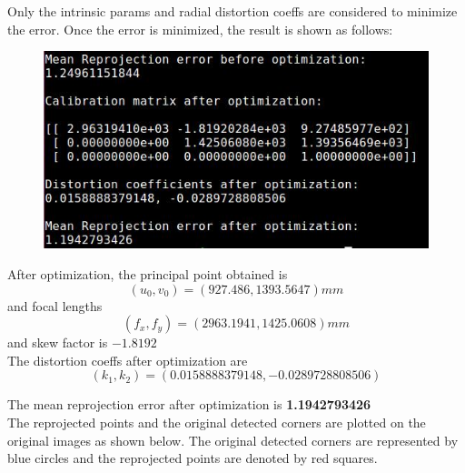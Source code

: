 \documentclass[conference]{IEEEtran}
\begin{document}
Only the intrinsic params and radial distortion coeffs are considered to minimize the error. Once the error is minimized, the result is shown as follows:
\begin{figure}[H]
\centering
\includegraphics[scale = 0.45]{13.jpg}
\label{fig_sim}
\end{figure}
 
After optimization, the principal point obtained is $$(u_0, v_0) = (927.486, 1393.5647) mm$$ and focal lengths $$(f_x, f_y) = (2963.1941, 1425.0608) mm $$ and skew factor is $-1.8192$\\

The distortion coeffs after optimization are $$(k_1, k_2) = (0.0158888379148, -0.0289728808506)$$

The mean reprojection error after optimization is \textbf{1.1942793426}\\

The reprojected points and the original detected corners are plotted on the original images as shown below. The original detected corners are represented by blue circles and the reprojected points are denoted by red squares.
\end{document}
